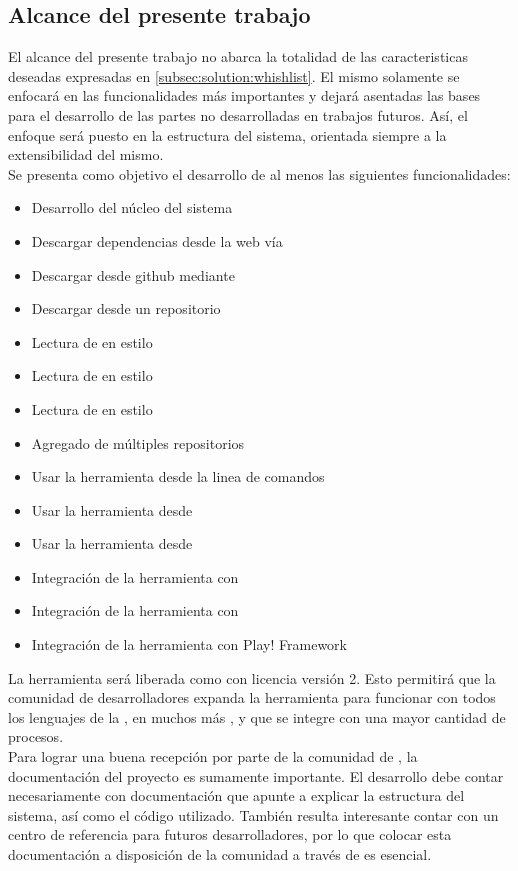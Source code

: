 \subsection{Alcance del presente trabajo}
\label{subsec:solution:todo}

El alcance del presente trabajo no abarca la totalidad de las caracteristicas 
deseadas expresadas en \ref{subsec:solution:whishlist}. El mismo solamente se 
enfocará en las funcionalidades más importantes y  dejará asentadas las bases 
para el desarrollo de las partes no desarrolladas en trabajos futuros. Así, el 
enfoque será puesto en la estructura del sistema, orientada siempre a la 
extensibilidad del mismo.\\
Se presenta como objetivo el desarrollo de al menos las siguientes 
funcionalidades:
\begin{itemize}
	\setlength{\itemsep}{1pt}
	\setlength{\parskip}{0pt}
	\setlength{\parsep}{0pt}
	\item Desarrollo del núcleo del sistema
	\item Descargar dependencias desde la web vía \http
	\item Descargar desde \gls{github} mediante \git
	\item Descargar desde un repositorio \svn
	\item Lectura de \conffiles en \xml estilo \apache \maven
	\item Lectura de \conffiles en \xml estilo \apache \ivy
	\item Lectura de \conffiles en estilo \sbt
	\item Agregado de múltiples repositorios
	\item Usar la herramienta desde la linea de comandos
	\item Usar la herramienta desde \scala
	\item Usar la herramienta desde \java
	\item Integración de la herramienta con \apache \maven
	\item Integración de la herramienta con \sbt
	\item Integración de la herramienta con Play! Framework
\end{itemize}

La herramienta será liberada como \freesoft con licencia \apache versión 2. 
Esto permitirá que la comunidad de desarrolladores expanda la herramienta para  
funcionar con todos los lenguajes de la \jvm, en muchos más \frameworks, y que  
se integre con una mayor cantidad de procesos.\\
Para lograr una buena recepción por parte de la comunidad de \freesoft, la 
documentación del proyecto es sumamente importante. El desarrollo debe contar 
necesariamente con documentación que apunte a explicar la estructura del 
sistema, así como el código utilizado. También resulta interesante contar con 
un centro de referencia para futuros desarrolladores, por lo que colocar esta 
documentación a disposición de la comunidad a través de \internet es esencial.

